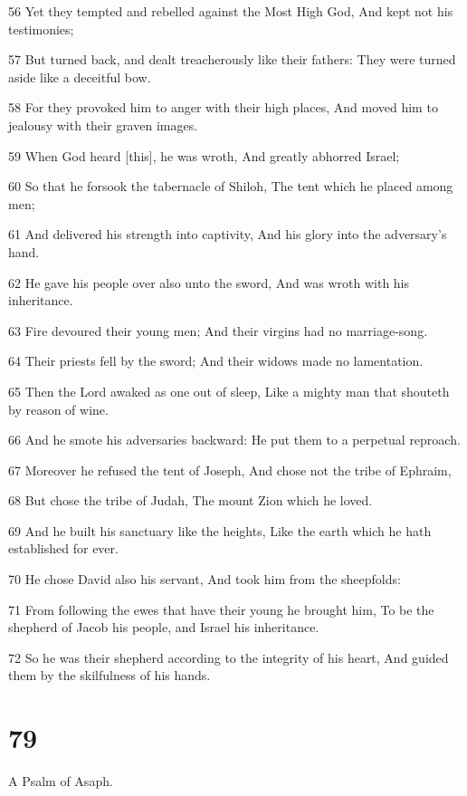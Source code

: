\par 56 Yet they tempted and rebelled against the Most High God, And kept not his testimonies;
\par 57 But turned back, and dealt treacherously like their fathers: They were turned aside like a deceitful bow.
\par 58 For they provoked him to anger with their high places, And moved him to jealousy with their graven images.
\par 59 When God heard [this], he was wroth, And greatly abhorred Israel;
\par 60 So that he forsook the tabernacle of Shiloh, The tent which he placed among men;
\par 61 And delivered his strength into captivity, And his glory into the adversary's hand.
\par 62 He gave his people over also unto the sword, And was wroth with his inheritance.
\par 63 Fire devoured their young men; And their virgins had no marriage-song.
\par 64 Their priests fell by the sword; And their widows made no lamentation.
\par 65 Then the Lord awaked as one out of sleep, Like a mighty man that shouteth by reason of wine.
\par 66 And he smote his adversaries backward: He put them to a perpetual reproach.
\par 67 Moreover he refused the tent of Joseph, And chose not the tribe of Ephraim,
\par 68 But chose the tribe of Judah, The mount Zion which he loved.
\par 69 And he built his sanctuary like the heights, Like the earth which he hath established for ever.
\par 70 He chose David also his servant, And took him from the sheepfolds:
\par 71 From following the ewes that have their young he brought him, To be the shepherd of Jacob his people, and Israel his inheritance.
\par 72 So he was their shepherd according to the integrity of his heart, And guided them by the skilfulness of his hands.

\chapter{79}

\par A Psalm of Asaph.

